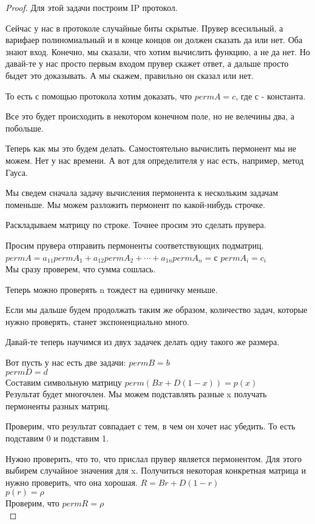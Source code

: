 \begin{proof}
Для этой задачи построим IP протокол. 

Сейчас у нас в протоколе случайные биты скрытые.
Прувер всесильный, а варифаер полиномиальный и
в конце концов он должен сказать да или нет. Оба знают
вход. Конечно, мы сказали, что хотим вычислить функцию,
а не да нет. Но давай-те у нас просто первым входом
прувер скажет ответ, а дальше просто быдет это доказывать.  
А мы скажем, правильно он сказал или нет. 

То есть с помощью протокола 
хотим доказать, что $perm A = c$, где с - константа. 

Все это будет происходить в некотором конечном поле, но не
велечины два, а побольше. 

Теперь как мы это будем делать. Самостоятельно вычислить пермонент мы не 
можем. Нет у нас времени. А вот для определителя у нас есть, 
например, метод Гауса. 

Мы сведем сначала задачу вычисления пермонента к нескольким задачам поменьше. 
Мы можем разложить пермонент по какой-нибудь строчке. 

Раскладываем матрицу по строке. Точнее просим это сделать прувера. 

Просим прувера отправить пермоненты соответствующих подматриц. 
$permA = a_{11} perm A_1 + a_{12}perm A_2 + \cdots + a_{1n}perm A_n = с$
$perm A_{i} = c_i$\\

Мы сразу проверем, что сумма сошлась. 

Теперь можно проверять n тождест на единичку меньше.

Если мы дальше будем продолжать таким же образом, количество
задач, которые нужно проверять, станет экспоненциально много. 

Давай-те теперь научимся из двух задачек делать одну такого же размера. 

Вот пусть у нас есть две задачи:
$perm B = b$\\
$perm D = d$\\

Составим символьную матрицу $perm(Bx + D(1 - x)) = p(x)$ \\
Результат будет многочлен. 
Мы можем подставлять разные x получать пермоненты разных матриц. 

Проверим, что результат совпадает с тем, в чем он хочет нас убедить. 
То есть подставим 0 и подставим 1. 

Нужно проверить, что то, что прислал прувер является пермонентом. Для этого выбирем 
случайное значения для x. Получиться некоторая конкретная матрица и нужно проверить, что она хорошая. 
$R = Br + D(1 - r)$\\
$p(r) = \rho$\\
Проверим, что $perm R = \rho$\\
                                                                  

\end{proof}

